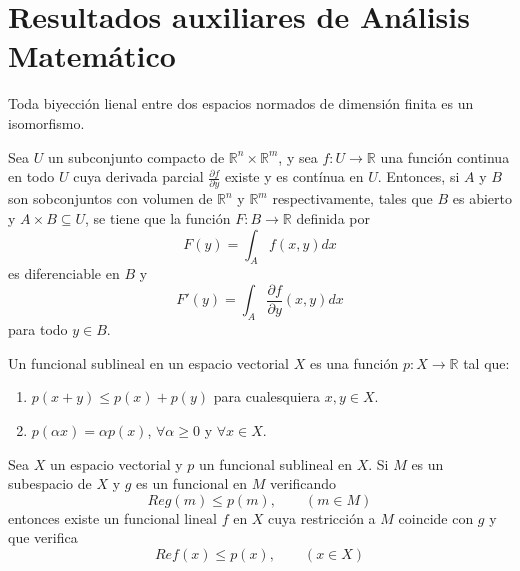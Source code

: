 \section{Resultados auxiliares de Análisis Matemático}

\begin{teorema}\label{thm:h01}
Toda biyección lienal entre dos espacios normados de dimensión finita es un isomorfismo. 
\end{teorema}

\begin{teorema}\label{thm:h02}
Sea $U$ un subconjunto compacto de $\mathds{R}^{n}\times\mathds{R}^{m}$, y sea $f: U \rightarrow \mathds{R}$ una función continua en todo $U$ cuya derivada parcial $\frac{\partial f}{\partial y}$ existe y es contínua en $U$. Entonces, si $A$ y $B$ son sobconjuntos con volumen de $\mathds{R}^{n}$ y $\mathds{R}^{m}$ respectivamente, tales que $B$ es abierto y $A\times B \subseteq U$, se tiene que la función $F:B\rightarrow \mathds{R}$ definida por 
\begin{equation}
F(y) = \int_{A} f(x,y) dx
\end{equation}
es diferenciable en $B$ y 
\begin{equation}
F'(y) = \int_{A}\frac{\partial f}{\partial y} (x,y) dx
\end{equation}
para todo $y\in B$.
\end{teorema}

\begin{definicion}
Un funcional sublineal en un espacio vectorial $X$ es una función $p:X\rightarrow \mathds{R}$ tal que:
\begin{enumerate}
\item $p(x+y)\leq p(x) + p(y)$ para cualesquiera $x,y\in X$.
\item $p(\alpha x) = \alpha p(x)$, $\forall\alpha \geq 0$ y  $\forall x\in X$.
\end{enumerate}
\end{definicion}

\begin{teorema}\label{thm:h03}
Sea $X$ un espacio vectorial y $p$ un funcional sublineal en $X$. Si $M$ es un subespacio de $X$ y $g$ es un funcional en $M$ verificando 
$$ Re g(m) \leq p(m), \qquad (m\in M)$$
entonces existe un funcional lineal $f$ en $X$ cuya restricción a $M$ coincide con $g$ y que verifica
$$Re f(x) \leq p(x), \qquad (x\in X)$$
\end{teorema}


